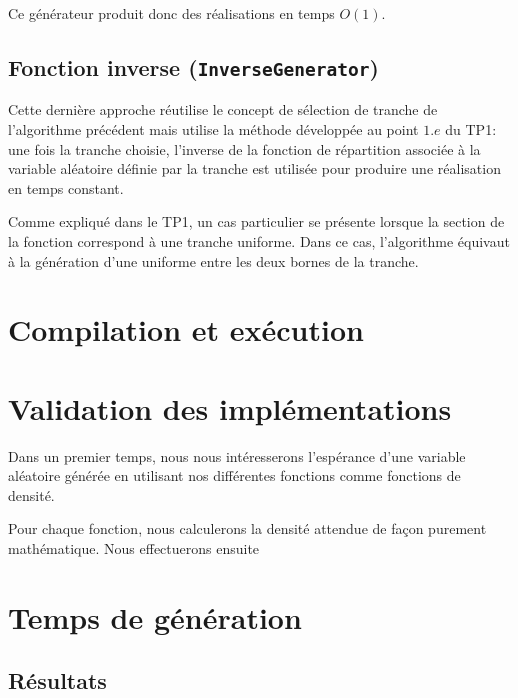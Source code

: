 \documentclass[a4paper,11pt]{article}
\begin{document}
Ce générateur produit donc des réalisations en temps $O(1)$.

\subsection{Fonction inverse {\normalfont({\tt InverseGenerator})}}

Cette dernière approche réutilise le concept de sélection de tranche de l'algorithme précédent mais utilise la méthode développée au point $1.e$ du TP1: une fois la tranche choisie, l'inverse de la fonction de répartition associée à la variable aléatoire définie par la tranche est utilisée pour produire une réalisation en temps constant.

Comme expliqué dans le TP1, un cas particulier se présente lorsque la section de la fonction correspond à une tranche uniforme. Dans ce cas, l'algorithme équivaut à la génération d'une uniforme entre les deux bornes de la tranche. 

\section{Compilation et exécution}

\section{Validation des implémentations}

Dans un premier temps, nous nous intéresserons l'espérance d'une variable aléatoire générée en utilisant nos différentes fonctions comme fonctions de densité.

Pour chaque fonction, nous calculerons la densité attendue de façon purement mathématique. Nous effectuerons ensuite 

\section{Temps de génération}

\subsection{Résultats}
\end{document}
